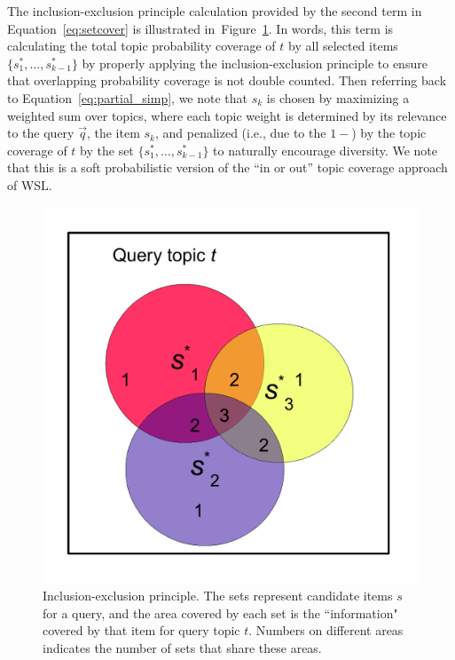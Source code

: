 The inclusion-exclusion principle calculation provided by the second
term in Equation~\ref{eq:setcover} is illustrated
in~Figure~\ref{fig:inclusionExclusionPrinciple}. In words, this term
is calculating the total topic probability coverage of $t$ by all
selected items $\{ s_1^*,\ldots,s_{k-1}^* \}$ by properly applying the
inclusion-exclusion principle to ensure that overlapping probability
coverage is not double counted. Then referring back to
Equation~\ref{eq:partial_simp}, we note that $s_k$ is chosen by
maximizing a weighted sum over topics, where each topic weight is
determined by its relevance to the query $\vec{q}$, the item $s_k$,
and penalized (i.e., due to the $1 - $) by the topic coverage of $t$
by the set $\{ s_1^*,\ldots,s_{k-1}^* \}$ to naturally encourage
diversity.  We note that this is a soft probabilistic version of the
``in or out'' topic coverage approach of WSL.

\begin{figure}[t!]
\begin{center}
\centerline{\includegraphics[scale = 0.4]{inclusionExclusionPrinciple}}
\caption[Inclusion-exclusion principle.]{Inclusion-exclusion principle. The sets represent candidate
items $s$ for a query, and the area covered by each set is the
``information" covered by that item for query topic $t$. Numbers on different areas
indicates the number of sets that share these areas. }
\label{fig:inclusionExclusionPrinciple}
\end{center}
\end{figure}

